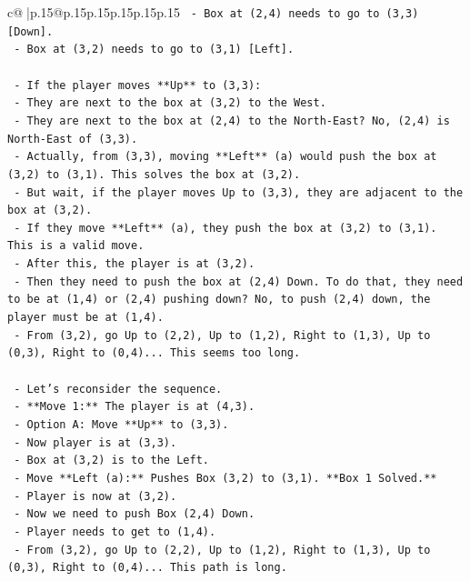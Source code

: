 \documentclass{article}
\begin{document}
{\begin{supertabular}{c@{$\;$}|p{.15\linewidth}@{}p{.15\linewidth}p{.15\linewidth}p{.15\linewidth}p{.15\linewidth}p{.15\linewidth}}
{{{\texttt{        {-} Box at (2,4) needs to go to (3,3) {[}Down{]}.} \\
\texttt{        {-} Box at (3,2) needs to go to (3,1) {[}Left{]}.} \\
\\ 
\texttt{    {-} If the player moves **Up** to (3,3):} \\
\texttt{        {-} They are next to the box at (3,2) to the West.} \\
\texttt{        {-} They are next to the box at (2,4) to the North{-}East? No, (2,4) is North{-}East of (3,3).} \\
\texttt{        {-} Actually, from (3,3), moving **Left** (a) would push the box at (3,2) to (3,1). This solves the box at (3,2).} \\
\texttt{        {-} But wait, if the player moves Up to (3,3), they are adjacent to the box at (3,2).} \\
\texttt{        {-} If they move **Left** (a), they push the box at (3,2) to (3,1). This is a valid move.} \\
\texttt{        {-} After this, the player is at (3,2).} \\
\texttt{        {-} Then they need to push the box at (2,4) Down. To do that, they need to be at (1,4) or (2,4) pushing down? No, to push (2,4) down, the player must be at (1,4).} \\
\texttt{        {-} From (3,2), go Up to (2,2), Up to (1,2), Right to (1,3), Up to (0,3), Right to (0,4)... This seems too long.} \\
\\ 
\texttt{    {-} Let's reconsider the sequence.} \\
\texttt{    {-} **Move 1:** The player is at (4,3).} \\
\texttt{        {-} Option A: Move **Up** to (3,3).} \\
\texttt{            {-} Now player is at (3,3).} \\
\texttt{            {-} Box at (3,2) is to the Left.} \\
\texttt{            {-} Move **Left (a):** Pushes Box (3,2) to (3,1). **Box 1 Solved.**} \\
\texttt{            {-} Player is now at (3,2).} \\
\texttt{            {-} Now we need to push Box (2,4) Down.} \\
\texttt{            {-} Player needs to get to (1,4).} \\
\texttt{            {-} From (3,2), go Up to (2,2), Up to (1,2), Right to (1,3), Up to (0,3), Right to (0,4)... This path is long.} \\
}}}
\end{supertabular}}
\end{document}
